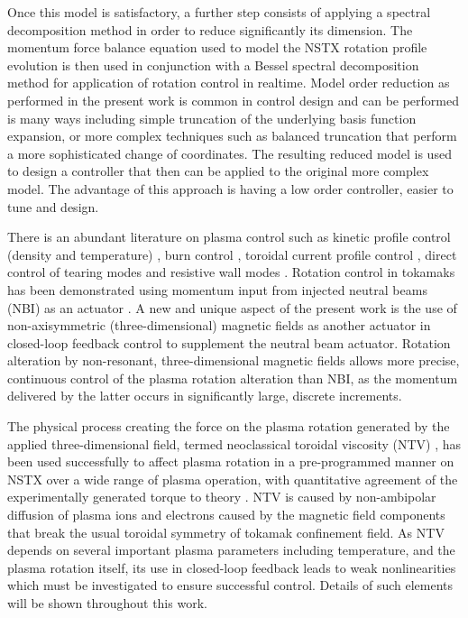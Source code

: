 \documentclass[12pt]{iopart}
\begin{document}
Once this model is satisfactory, a further step consists of applying a spectral decomposition method in order to reduce significantly its dimension. The momentum force balance equation used to model the NSTX rotation profile evolution is then used in conjunction with a Bessel spectral decomposition method for application of rotation control in realtime. Model order reduction as performed in the present work is common in control design and can be performed is many ways including simple truncation of the underlying basis function expansion, or more complex techniques such as balanced truncation \cite{Moore81} that perform a more sophisticated change of coordinates. The resulting reduced model is used to design a controller that then can be applied to the original more complex model. The advantage of this approach is having a low order controller, easier to tune and design.
 
There is an abundant literature on plasma control such as kinetic profile control (density and temperature) \cite{Schuster02, Boyer11}, burn control \cite{Schuster01, Schuster02-2, Schuster02-3, Vitela98, Boyer12}, toroidal current profile control \cite{Boyer133, Boyer144, Barton12, Ou09, Ebrahimi04}, direct control of tearing modes \cite{Welander13, Volpe09} and resistive wall modes \cite{Sabbagh06,Sabbagh13}. Rotation control in tokamaks has been demonstrated using momentum input from injected neutral beams (NBI) as an actuator \cite{Scoville07}.  A new and unique aspect of the present work is the use of non-axisymmetric (three-dimensional) magnetic fields as another actuator in closed-loop feedback control to supplement the neutral beam actuator. Rotation alteration by non-resonant, three-dimensional magnetic fields allows more precise, continuous control of the plasma rotation alteration than NBI, as the momentum delivered by the latter occurs in significantly large, discrete increments.

The physical process creating the force on the plasma rotation generated by the applied three-dimensional field, termed neoclassical toroidal viscosity (NTV) \cite{Shaing88, Shaing10, Shaing15}, has been used successfully to affect plasma rotation in a pre-programmed manner on NSTX over a wide range of plasma operation, with quantitative agreement of the experimentally generated torque to theory \cite{Zhu06}. NTV is caused by non-ambipolar diffusion of plasma ions and electrons caused by the magnetic field components that break the usual toroidal symmetry of tokamak confinement field. As NTV depends on several important plasma parameters including temperature, and the plasma rotation itself, its use in closed-loop feedback leads to weak nonlinearities which must be investigated to ensure successful control. Details of such elements will be shown throughout this work. 
\end{document}
